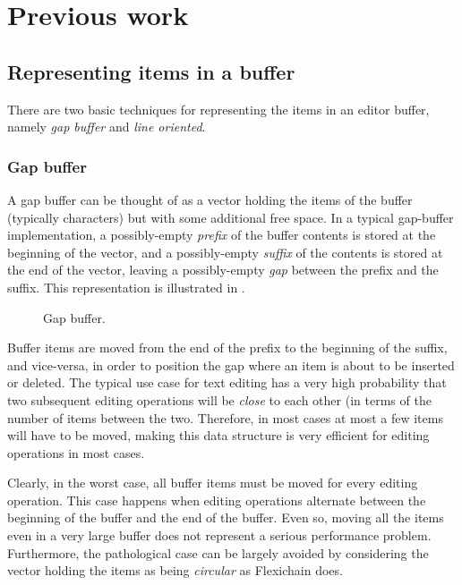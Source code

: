 \section{Previous work}
\label{sec-previous-work}

\subsection{Representing items in a buffer}

There are two basic techniques for representing the items in an editor
buffer, namely \emph{gap buffer} and \emph{line oriented}.

\subsubsection{Gap buffer}
\label{sec-previous-gap-buffer}

A gap buffer can be thought of as a vector holding the items of the
buffer (typically characters) but with some additional free space.  In
a typical gap-buffer implementation, a possibly-empty \emph{prefix} of
the buffer contents is stored at the beginning of the vector, and a
possibly-empty \emph{suffix} of the contents is stored at the end of
the vector, leaving a possibly-empty \emph{gap} between the prefix and
the suffix.  This representation is illustrated in
.

\begin{figure}
\begin{center}
\end{center}
\caption{\label{fig-gap-buffer}
Gap buffer.}
\end{figure}

Buffer items are moved from the end of the prefix to the beginning of
the suffix, and vice-versa, in order to position the gap where an item
is about to be inserted or deleted.  The typical use case for text
editing has a very high probability that two subsequent editing
operations will be \emph{close} to each other (in terms of the number
of items between the two.  Therefore, in most cases at most a few
items will have to be moved, making this data structure is very
efficient for editing operations in most cases.

Clearly, in the worst case, all buffer items must be moved for every
editing operation.  This case happens when editing operations
alternate between the beginning of the buffer and the end of the
buffer.  Even so, moving all the items even in a very large buffer
does not represent a serious performance problem.  Furthermore, the
pathological case can be largely avoided by considering the vector
holding the items as being \emph{circular} as Flexichain
\cite{flexichain} does.

